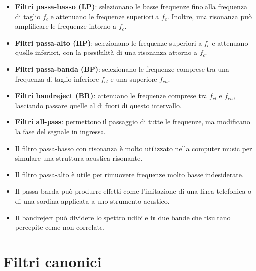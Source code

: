 \begin{itemize}
    \item \textbf{Filtri passa-basso (LP)}: selezionano le basse frequenze fino alla frequenza di taglio $f_c$ e attenuano le frequenze superiori a $f_c$. Inoltre, una risonanza può amplificare le frequenze intorno a $f_c$.

    \item \textbf{Filtri passa-alto (HP)}: selezionano le frequenze superiori a $f_c$ e attenuano quelle inferiori, con la possibilità di una risonanza attorno a $f_c$.

    \item \textbf{Filtri passa-banda (BP)}: selezionano le frequenze comprese tra una frequenza di taglio inferiore $f_{cl}$ e una superiore $f_{ch}$.

    \item \textbf{Filtri bandreject (BR)}: attenuano le frequenze comprese tra $f_{cl}$ e $f_{ch}$, lasciando passare quelle al di fuori di questo intervallo.

    \item \textbf{Filtri all-pass}: permettono il passaggio di tutte le frequenze, ma modificano la fase del segnale in ingresso.
\end{itemize}


\begin{itemize}
    \item Il filtro passa-basso con risonanza è molto utilizzato nella computer music per simulare una struttura acustica risonante.

    \item Il filtro passa-alto è utile per rimuovere frequenze molto basse indesiderate.

    \item Il passa-banda può produrre effetti come l'imitazione di una linea telefonica o di una sordina applicata a uno strumento acustico.

    \item Il bandreject può dividere lo spettro udibile in due bande che risultano percepite come non correlate.
\end{itemize}

\section{Filtri canonici}

